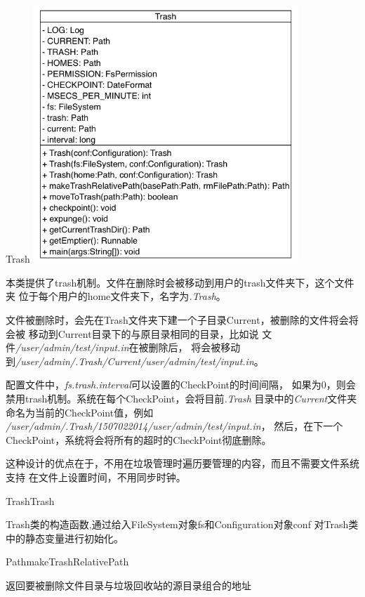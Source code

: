 \begin{XeClass}{Trash}
\includegraphics[width=10cm]{cdig/Trash.png}
     
 本类提供了trash机制。文件在删除时会被移动到用户的trash文件夹下，这个文件夹
 位于每个用户的home文件夹下，名字为\emph{.Trash}。
 
 文件被删除时，会先在Trash文件夹下建一个子目录Current，被删除的文件将会将会被
 移动到Current目录下的与原目录相同的目录，比如说
 文件\emph{/user/admin/test/input.in}在被删除后，
 将会被移动到\emph{/user/admin/.Trash/Current/user/admin/test/input.in}。
 
 配置文件中，\emph{fs.trash.interval}可以设置的CheckPoint的时间间隔，
 如果为0，则会禁用trash机制。系统在每个CheckPoint，会将目前\emph{.Trash}
 目录中的\emph{Current}文件夹命名为当前的CheckPoint值，例如
 \emph{/user/admin/.Trash/1507022014/user/admin/test/input.in}，
 然后，在下一个CheckPoint，系统将会将所有的超时的CheckPoint彻底删除。
 
 这种设计的优点在于，不用在垃圾管理时遍历要管理的内容，而且不需要文件系统支持
 在文件上设置时间，不用同步时钟。

    \begin{XeMethod}{\XePublic}{Trash}{Trash}
         
 Trash类的构造函数,通过给入FileSystem对象fs和Configuration对象conf
 对Trash类中的静态变量进行初始化。

    \end{XeMethod}

    \begin{XeMethod}{\XePrivate}{Path}{makeTrashRelativePath}
         
 返回要被删除文件目录与垃圾回收站的源目录组合的地址


\end{XeMethod}
\end{XeClass}
